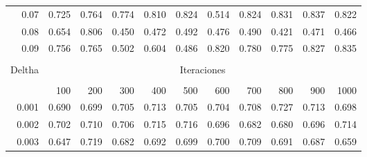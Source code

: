 \begin{table}[h]
\begin{tabular}{rrrrrrrrrrr}
0.07                       & 0.725                & 0.764                & 0.774                & 0.810                & 0.824                & 0.514                & 0.824                & 0.831                & 0.837                & 0.822                \\
0.08                       & 0.654                & 0.806                & 0.450                & 0.472                & 0.492                & 0.476                & 0.490                & 0.421                & 0.471                & 0.466                \\
0.09                       & 0.756                & 0.765                & 0.502                & 0.604                & 0.486                & 0.820                & 0.780                & 0.775                & 0.827                & 0.835                \\ \hline
\multicolumn{1}{l}{}       & \multicolumn{1}{l}{} & \multicolumn{1}{l}{} & \multicolumn{1}{l}{} & \multicolumn{1}{l}{} & \multicolumn{1}{l}{} & \multicolumn{1}{l}{} & \multicolumn{1}{l}{} & \multicolumn{1}{l}{} & \multicolumn{1}{l}{} & \multicolumn{1}{l}{} \\
\multicolumn{1}{l}{Deltha} & \multicolumn{10}{c}{Iteraciones}   \\ \hline                                                                                                                                                                                                   \\
\multicolumn{1}{l}{}       & 100                  & 200                  & 300                  & 400                  & 500                  & 600                  & 700                  & 800                  & 900                  & 1000                 \\
0.001                      & 0.690                & 0.699                & 0.705                & 0.713                & 0.705                & 0.704                & 0.708                & 0.727                & 0.713                & 0.698                \\
0.002                      & 0.702                & 0.710                & 0.706                & 0.715                & 0.716                & 0.696                & 0.682                & 0.680                & 0.696                & 0.714                \\
0.003                      & 0.647                & 0.719                & 0.682                & 0.692                & 0.699                & 0.700                & 0.709                & 0.691                & 0.687                & 0.659                \\

\end{tabular}
\end{table}
